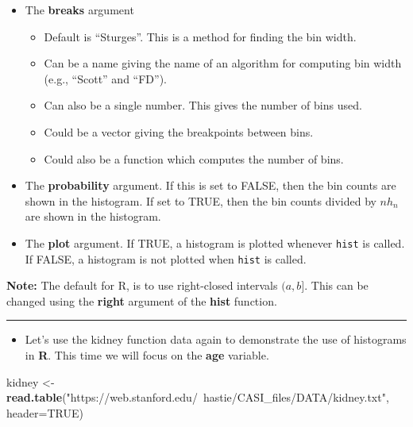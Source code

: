 \documentclass[]{book}
\newenvironment{Shaded}{\begin{snugshade}}{\end{snugshade}}
\newcommand{\DataTypeTok}[1]{\textcolor[rgb]{0.13,0.29,0.53}{#1}}
\newcommand{\KeywordTok}[1]{\textcolor[rgb]{0.13,0.29,0.53}{\textbf{#1}}}
\newcommand{\NormalTok}[1]{#1}
\newcommand{\OtherTok}[1]{\textcolor[rgb]{0.56,0.35,0.01}{#1}}
\newcommand{\StringTok}[1]{\textcolor[rgb]{0.31,0.60,0.02}{#1}}
\providecommand{\tightlist}{%
  \setlength{\itemsep}{0pt}\setlength{\parskip}{0pt}}
\begin{document}
\begin{itemize}
\item
  The \textbf{breaks} argument

  \begin{itemize}
  \tightlist
  \item
    Default is ``Sturges''. This is a method for finding the bin width.
  \item
    Can be a name giving the name of an algorithm for computing bin width
    (e.g., ``Scott'' and ``FD'').
  \item
    Can also be a single number. This gives the number of bins used.
  \item
    Could be a vector giving the breakpoints between bins.
  \item
    Could also be a function which computes the number of bins.
  \end{itemize}
\item
  The \textbf{probability} argument. If this is set to FALSE, then the
  bin counts are shown in the histogram. If set to TRUE, then the
  bin counts divided by \(nh_{n}\) are shown in the histogram.
\item
  The \textbf{plot} argument. If TRUE, a histogram is plotted
  whenever \texttt{hist} is called. If FALSE, a histogram is not
  plotted when \texttt{hist} is called.
\end{itemize}

\textbf{Note:} The default for R, is to use right-closed intervals \((a, b]\).
This can be changed using the \textbf{right} argument of the \textbf{hist} function.

\begin{center}\rule{0.5\linewidth}{\linethickness}\end{center}

\begin{itemize}
\tightlist
\item
  Let's use the kidney function data again to demonstrate the use of histograms in \textbf{R}. This time
  we will focus on the \textbf{age} variable.
\end{itemize}

\begin{Shaded}
\begin{Highlighting}[]
\NormalTok{kidney <-}\StringTok{ }\KeywordTok{read.table}\NormalTok{(}\StringTok{"https://web.stanford.edu/~hastie/CASI_files/DATA/kidney.txt"}\NormalTok{, }
                     \DataTypeTok{header=}\OtherTok{TRUE}\NormalTok{)}
\end{Highlighting}
\end{Shaded}
\end{document}
